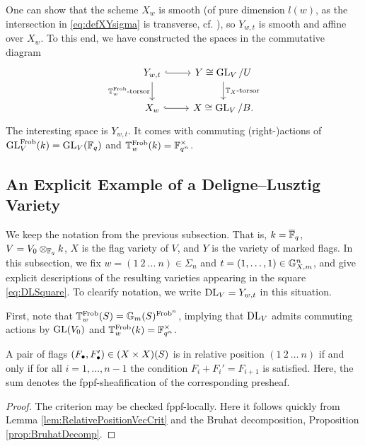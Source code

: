 \documentclass[../main.tex]{subfiles}
\begin{document}
One can show that the scheme $X_w$ is smooth (of pure dimension $l(w)$, 
as the intersection in \eqref{eq:defXYsigma} is transverse, cf.
\cite{delignelusztig1976}), so $Y_{w, t}$ is smooth and affine over $X_w$. 
To this end, we have constructed the spaces in the commutative diagram
\begin{equation} \label{eq:DLSquare}
\begin{tikzcd}[ampersand replacement=\&]
	{Y_{w,t}} \& {Y \cong \GL_V/U} \\
	{X_w} \& {X \cong \GL_V/B.}
	\arrow[hook, from=1-1, to=1-2]
	\arrow["{\TT_w^{\Frob}\text{-torsor}}"', from=1-1, to=2-1]
	\arrow["{\TT_X\text{-torsor}}", from=1-2, to=2-2]
	\arrow[hook, from=2-1, to=2-2]
\end{tikzcd}
\end{equation}
The interesting space is $Y_{w,t}$. It comes with commuting (right-)actions of 
$\operatorname{GL}_V^{\mathrm{Frob}}(k) = \operatorname{GL}_V(\mathbb{F}_q)$ and $\mathbb{T}_w^{\mathrm{Frob}}(k) = \mathbb{F}_{q^n}^\times$. 

\subsection{An Explicit Example of a Deligne--Lusztig Variety} %
\label{sub:An Explicit Example}
We keep the notation from the previous subsection. That is, $k = \overline {\mathbb{F}}_q$, 
$V = V_0 \otimes_{\mathbb{F}_q} k$, $X$ is the flag variety of $V$, and $Y$ is the 
variety of marked flags. In this subsection, we fix
$w = (1 \ 2 \ \dots \ n) \in \Sigma_n$ and $t = (1, \dots, 1) \in \mathbb{G}_{X,m}^n$,
and give explicit descriptions of the resulting varieties appearing in the
square \eqref{eq:DLSquare}. To clearify notation, we write $\mathrm{DL}_V = Y_{w, t}$ in this
situation.

First, note that $\mathbb{T}_w^{\mathrm{Frob}}(S) = \mathbb{G}_m(S)^{\mathrm{Frob}^n}$, implying that
$\mathrm{DL}_V$ admits commuting actions 
by $\operatorname{GL}(V_0)$ and $\mathbb{T}_w^{\mathrm{Frob}}(k) = \mathbb{F}_{q^n}^\times$.

\begin{lem}\label{lem:FlagsInRelPosWareez}
  A pair of flags $(F_\bullet, F_\bullet') \in (X \times X)(S)$ is in relative position
  $(1 \ 2 \ \dots \ n)$ 
  if and only if for all $i = 1, \dots, n-1$ the condition $F_i + F_i' =
  F_{i+1}$ is satisfied. Here, the sum denotes the fppf-sheafification of the
  corresponding presheaf. 
\begin{proof}
  The criterion may be checked fppf-locally.
  Here it follows quickly from Lemma \ref{lem:RelativePositionVecCrit} and 
  the Bruhat decomposition, Proposition \ref{prop:BruhatDecomp}.
  \end{proof}
\end{lem}
\end{document}
